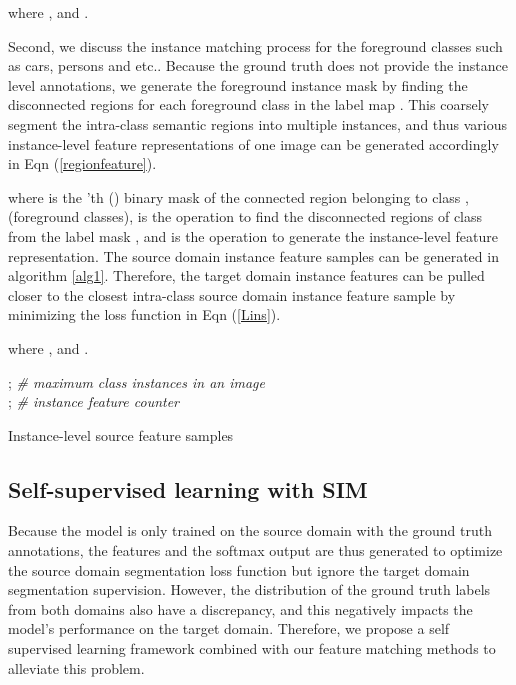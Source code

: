 \documentclass[10pt,twocolumn,letterpaper]{article}
\begin{document}
where , and .

Second, we discuss the instance matching process for the foreground classes such as cars, persons and etc.. Because the ground truth does not provide the instance level annotations, we generate the foreground instance mask by finding the disconnected regions for each foreground class in the label map . This coarsely segment the intra-class semantic regions into multiple instances, and thus various instance-level feature representations of one image can be generated accordingly in Eqn (\ref{regionfeature}).
\vspace{-2mm}

where  is the 'th () binary mask of the connected region belonging to class ,  (foreground classes),  is the operation to find the disconnected regions of class  from the label mask , and  is the operation to generate the instance-level feature representation. The source domain instance feature samples can be generated in algorithm \ref{alg1}.
Therefore, the target domain instance features can be pulled closer to the closest intra-class source domain instance feature sample by minimizing the loss function in Eqn (\ref{Lins}).
\vspace{-2mm}

where , and .

\begin{algorithm}[]
\SetAlgoLined
\KwResult{}
 ; \emph{\# maximum class instances in an image} \\
 ; \emph{\# instance feature counter}\\
 \caption{Instance-level source feature samples}
 \label{alg1}
\end{algorithm}

\subsection{Self-supervised learning with SIM}
Because the model is only trained on the source domain with the ground truth annotations, the features and the softmax output are thus generated to optimize the source domain segmentation loss function but ignore the target domain segmentation supervision. However, the distribution of the ground truth labels from both domains also have a discrepancy, and this negatively impacts the model's performance on the target domain. Therefore, we propose a self supervised learning framework combined with our feature matching methods to alleviate this problem. 
\end{document}
